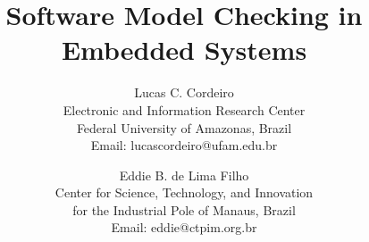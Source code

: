 \documentclass{acm_sen_article}
\begin{document}
%
\title{Software Model Checking in Embedded Systems}


\author{Lucas C. Cordeiro \\
Electronic and Information Research Center\\
Federal University of Amazonas, Brazil\\
Email: lucascordeiro@ufam.edu.br
\and
Eddie B. de Lima Filho \\
Center for Science, Technology, and Innovation \\ for the Industrial Pole of Manaus, Brazil \\
Email: eddie@ctpim.org.br}


% 
\end{document}
